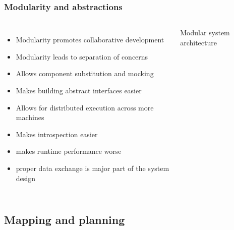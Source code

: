 \documentclass[aspectratio=169,9pt]{beamer}
\begin{document}
\begin{frame}
\frametitle{Modularity and abstractions}

\begin{columns}[c]


\begin{itemize}
  \item Modularity promotes collaborative development
  \item Modularity leads to separation of concerns
  \item Allows component substitution and mocking
  \item Makes building abstract interfaces easier
  \item Allows for distributed execution across more machines
  \item Makes introspection easier
  \item {\color{red} makes runtime performance worse}
  \item {\color{red} proper data exchange is major part of the system design}
\end{itemize}


\begin{block}{Modular system architecture}
  \begin{adjustbox}{max totalsize={1.0\textwidth}{.65\textheight}, center}
    
  \end{adjustbox}
\end{block}

\end{columns}

\end{frame}





\subsection{Mapping and planning}

\end{document}
